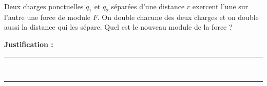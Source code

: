 Deux charges ponctuelles $q_1$ et $q_2$ séparées d'une distance $r$ exercent l'une sur l'autre une force de module $F$. On double chacune des deux charges et on double aussi la distance qui les sépare. Quel est le nouveau module de la force ?

\choices

\noindent\textbf{Justification :} \hrulefill \\[2.5ex]
\rule{\linewidth}{0.4pt} \\[2.5ex]
\rule{\linewidth}{0.4pt}
\vfill
